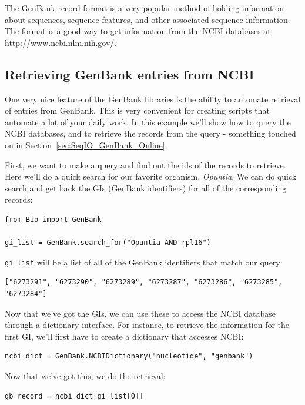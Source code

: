 \documentclass{report}
\begin{document}
The GenBank record format is a very popular method of holding information about sequences, sequence features, and other associated sequence information. The format is a good way to get information from the NCBI databases at \url{http://www.ncbi.nlm.nih.gov/}.

\subsection{Retrieving GenBank entries from NCBI}
\label{genbank-retrieval}

One very nice feature of the GenBank libraries is the ability to automate retrieval of entries from GenBank. This is very convenient for creating scripts that automate a lot of your daily work. In this example we'll show how to query the NCBI databases, and to retrieve the records from the query - something touched on in Section~\ref{sec:SeqIO_GenBank_Online}.

First, we want to make a query and find out the ids of the records to retrieve. Here we'll do a quick search for our favorite organism, \emph{Opuntia}. We can do quick search and get back the GIs (GenBank identifiers) for all of the corresponding records:

\begin{verbatim}
from Bio import GenBank

gi_list = GenBank.search_for("Opuntia AND rpl16")
\end{verbatim}

\verb|gi_list| will be a list of all of the GenBank identifiers that match our query:

\begin{verbatim}
["6273291", "6273290", "6273289", "6273287", "6273286", "6273285", "6273284"]
\end{verbatim}

Now that we've got the GIs, we can use these to access the NCBI database through a dictionary interface. For instance, to retrieve the information for the first GI, we'll first have to create a dictionary that accesses NCBI:

\begin{verbatim}
ncbi_dict = GenBank.NCBIDictionary("nucleotide", "genbank")
\end{verbatim}

Now that we've got this, we do the retrieval:

\begin{verbatim}
gb_record = ncbi_dict[gi_list[0]]
\end{verbatim}
\end{document}
